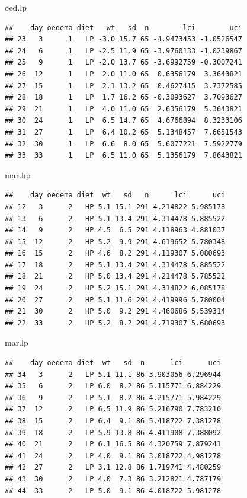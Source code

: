 \documentclass[12pt,a4paper]{book}
\newenvironment{Shaded}{\begin{snugshade}}{\end{snugshade}}
\newcommand{\NormalTok}[1]{#1}
\theoremstyle{definition}
\theoremstyle{definition}
\theoremstyle{definition}
\theoremstyle{remark}
\begin{document}
\begin{Shaded}
\begin{Highlighting}[]
\NormalTok{oed.lp}
\end{Highlighting}
\end{Shaded}

\begin{verbatim}
##    day oedema diet   wt   sd  n        lci        uci
## 23   3      1   LP -3.0 15.7 65 -4.9473453 -1.0526547
## 24   6      1   LP -2.5 11.9 65 -3.9760133 -1.0239867
## 25   9      1   LP -2.0 13.7 65 -3.6992759 -0.3007241
## 26  12      1   LP  2.0 11.0 65  0.6356179  3.3643821
## 27  15      1   LP  2.1 13.2 65  0.4627415  3.7372585
## 28  18      1   LP  1.7 16.2 65 -0.3093627  3.7093627
## 29  21      1   LP  4.0 11.0 65  2.6356179  5.3643821
## 30  24      1   LP  6.5 14.7 65  4.6766894  8.3233106
## 31  27      1   LP  6.4 10.2 65  5.1348457  7.6651543
## 32  30      1   LP  6.6  8.0 65  5.6077221  7.5922779
## 33  33      1   LP  6.5 11.0 65  5.1356179  7.8643821
\end{verbatim}

\begin{Shaded}
\begin{Highlighting}[]
\NormalTok{mar.hp}
\end{Highlighting}
\end{Shaded}

\begin{verbatim}
##    day oedema diet  wt   sd   n      lci      uci
## 12   3      2   HP 5.1 15.1 291 4.214822 5.985178
## 13   6      2   HP 5.1 13.4 291 4.314478 5.885522
## 14   9      2   HP 4.5  6.5 291 4.118963 4.881037
## 15  12      2   HP 5.2  9.9 291 4.619652 5.780348
## 16  15      2   HP 4.6  8.2 291 4.119307 5.080693
## 17  18      2   HP 5.1 13.4 291 4.314478 5.885522
## 18  21      2   HP 5.0 13.4 291 4.214478 5.785522
## 19  24      2   HP 5.2 15.1 291 4.314822 6.085178
## 20  27      2   HP 5.1 11.6 291 4.419996 5.780004
## 21  30      2   HP 5.0  9.2 291 4.460686 5.539314
## 22  33      2   HP 5.2  8.2 291 4.719307 5.680693
\end{verbatim}

\begin{Shaded}
\begin{Highlighting}[]
\NormalTok{mar.lp}
\end{Highlighting}
\end{Shaded}

\begin{verbatim}
##    day oedema diet  wt   sd  n      lci      uci
## 34   3      2   LP 5.1 11.1 86 3.903056 6.296944
## 35   6      2   LP 6.0  8.2 86 5.115771 6.884229
## 36   9      2   LP 5.1  8.2 86 4.215771 5.984229
## 37  12      2   LP 6.5 11.9 86 5.216790 7.783210
## 38  15      2   LP 6.4  9.1 86 5.418722 7.381278
## 39  18      2   LP 5.9 13.8 86 4.411908 7.388092
## 40  21      2   LP 6.1 16.5 86 4.320759 7.879241
## 41  24      2   LP 4.0  9.1 86 3.018722 4.981278
## 42  27      2   LP 3.1 12.8 86 1.719741 4.480259
## 43  30      2   LP 4.0  7.3 86 3.212821 4.787179
## 44  33      2   LP 5.0  9.1 86 4.018722 5.981278
\end{verbatim}
\end{document}
